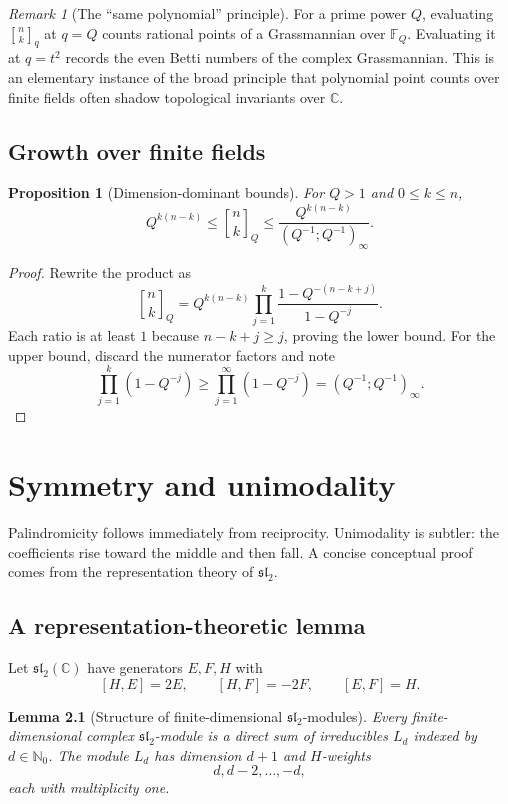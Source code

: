 \documentclass[11pt,oneside,openany]{book}
\newtheorem{lemma}[theorem]{Lemma}
\newtheorem{proposition}[theorem]{Proposition}
\theoremstyle{definition}
\theoremstyle{remark}
\newtheorem{remark}[theorem]{Remark}
\newcommand{\qbinom}[2]{\genfrac{[}{]}{0pt}{}{#1}{#2}_{q}}
\newcommand{\Qbinom}[3]{\genfrac{[}{]}{0pt}{}{#1}{#2}_{#3}}
\newcommand{\C}{\mathbb C}
\newcommand{\N}{\mathbb N}
\newcommand{\F}{\mathbb F}
\begin{document}
\begin{remark}[The ``same polynomial'' principle]
For a prime power $Q$, evaluating $\qbinom nk$ at $q=Q$ counts rational points of a Grassmannian over $\F_Q$.  Evaluating it at $q=t^2$ records the even Betti numbers of the complex Grassmannian.  This is an elementary instance of the broad principle that polynomial point counts over finite fields often shadow topological invariants over $\C$.
\end{remark}

\section{Growth over finite fields}

\begin{proposition}[Dimension-dominant bounds]\label{prop:qbinom-growth}
For $Q>1$ and $0\le k\le n$,
\[
 Q^{k(n-k)}
 \le \Qbinom nkQ
 \le \frac{Q^{k(n-k)}}{(Q^{-1};Q^{-1})_\infty}.
\]
\end{proposition}

\begin{proof}
Rewrite the product as
\[
 \Qbinom nkQ
 =Q^{k(n-k)}
 \prod_{j=1}^{k}\frac{1-Q^{-(n-k+j)}}{1-Q^{-j}}.
\]
Each ratio is at least $1$ because $n-k+j\ge j$, proving the lower bound.  For the upper bound, discard the numerator factors and note
\[
 \prod_{j=1}^{k}(1-Q^{-j})\ge\prod_{j=1}^{\infty}(1-Q^{-j})=(Q^{-1};Q^{-1})_\infty.
\]
\end{proof}

\chapter{Symmetry and unimodality}\label{chap:unimodality}

Palindromicity follows immediately from reciprocity.  Unimodality is subtler: the coefficients rise toward the middle and then fall.  A concise conceptual proof comes from the representation theory of $\mathfrak{sl}_2$.

\section{A representation-theoretic lemma}

Let $\mathfrak{sl}_2(\C)$ have generators $E,F,H$ with
\[
 [H,E]=2E,\qquad [H,F]=-2F,\qquad [E,F]=H.
\]

\begin{lemma}[Structure of finite-dimensional $\mathfrak{sl}_2$-modules]\label{lem:sl2-structure}
Every finite-dimensional complex $\mathfrak{sl}_2$-module is a direct sum of irreducibles $L_d$ indexed by $d\in\N_0$.  The module $L_d$ has dimension $d+1$ and $H$-weights
\[
 d,d-2,\dots,-d,
\]
each with multiplicity one.
\end{lemma}
\end{document}
